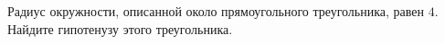 \begin{ex}
	\begin{condition}
		Радиус окружности, описанной около прямоугольного треугольника, равен \( 4 \). Найдите гипотенузу этого треугольника.
	\end{condition}
\end{ex}
